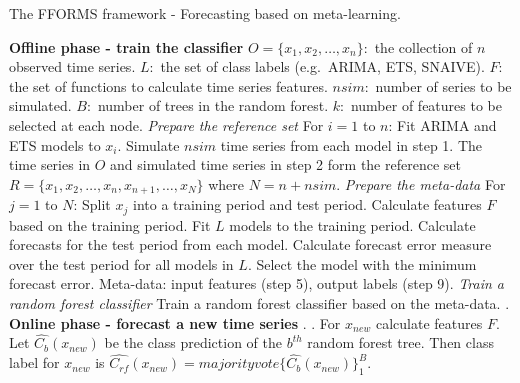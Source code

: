 \documentclass[11pt,a4paper,]{article}
\begin{document}
\begin{algorithm}[!ht]
  \caption{The FFORMS framework - Forecasting based on meta-learning. }
  \label{alg:algo-lab}
  \begin{algorithmic}[1]
    \Statex \textbf{Offline phase - train the classifier}
    \Statex {}
    \Statex \hspace{1cm}$O=\{x_1, x_2, \dots,x_n\}:$ the collection of $n$ observed time series.
      \Statex \hspace{1cm}$L:$ the set of class labels (e.g.\ ARIMA, ETS, SNAIVE).
         \Statex \hspace{1cm}$F:$ the set of functions to calculate time series features.
         \Statex \hspace{1cm}$nsim:$ number of series to be simulated.
         \Statex \hspace{1cm}$B:$ number of trees in the random forest.
         \Statex \hspace{1cm}$k:$ number of features to be selected at each node.
     \Statex {}
      \Statex \hspace{1cm}
      \Statex
     \Statex \textit{Prepare the reference set}
    \Statex For $i=1$ to $n$:
            \State Fit ARIMA and ETS models to $x_i$.
            \State Simulate $nsim$ time series from each model in step 1.
            \State The time series in $O$ and simulated time series in step 2 form the reference set $R=\{x_1, x_2, \dots,x_n, x_{n+1},\dots,x_N\}$ where $N = n + nsim$.
    \Statex
    \Statex \textit{Prepare the meta-data}
    \Statex For $j=1$ to $N$:
            \State Split $x_j$ into a training period and test period.
            \State Calculate features $F$ based on the training period.
            \State Fit $L$ models to the training period.
            \State Calculate forecasts for the test period from each model.
            \State Calculate forecast error measure over the test period for all models in $L$.
            \State Select the model with the minimum forecast error.
            \State Meta-data: input features (step 5), output labels (step 9).
     \Statex
    \Statex \textit{Train a random forest classifier}
            \State Train a random forest classifier based on the meta-data.
            .
    \Statex
     \Statex \textbf{Online phase - forecast a new time series}
    \Statex {}
    \Statex \hspace{1cm} .
     \Statex {}
      \Statex \hspace{1cm}.
  \State For $x_{new}$ calculate features $F$.
  \State Let $\hat{C_b}(x_{new})$ be the class prediction of the $b^{th}$ random forest tree. Then class label for $x_{new}$ is $\hat{C_{rf}}(x_{new})=majorityvote\{\hat{C_b}(x_{new})\}_1^B$.
   \end{algorithmic}
\end{algorithm}
\end{document}
